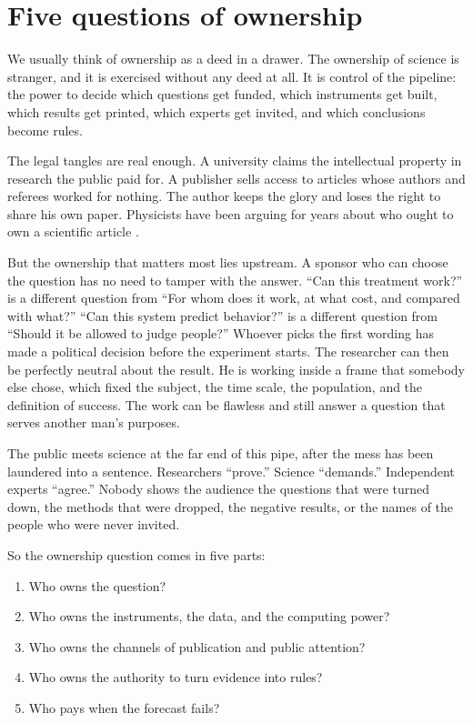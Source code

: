 \documentclass[12pt,a4paper]{book}
\begin{document}
\section{Five questions of ownership}

We usually think of ownership as a deed in a drawer. The ownership of science is stranger, and it is exercised without any deed at all. It is control of the pipeline: the power to decide which questions get funded, which instruments get built, which results get printed, which experts get invited, and which conclusions become rules.

The legal tangles are real enough. A university claims the intellectual property in research the public paid for. A publisher sells access to articles whose authors and referees worked for nothing. The author keeps the glory and loses the right to share his own paper. Physicists have been arguing for years about who ought to own a scientific article \cite{blume-aps-copyright}.

But the ownership that matters most lies upstream. A sponsor who can choose the question has no need to tamper with the answer. ``Can this treatment work?'' is a different question from ``For whom does it work, at what cost, and compared with what?'' ``Can this system predict behavior?'' is a different question from ``Should it be allowed to judge people?'' Whoever picks the first wording has made a political decision before the experiment starts. The researcher can then be perfectly neutral about the result. He is working inside a frame that somebody else chose, which fixed the subject, the time scale, the population, and the definition of success. The work can be flawless and still answer a question that serves another man's purposes.

The public meets science at the far end of this pipe, after the mess has been laundered into a sentence. Researchers ``prove.'' Science ``demands.'' Independent experts ``agree.'' Nobody shows the audience the questions that were turned down, the methods that were dropped, the negative results, or the names of the people who were never invited.

So the ownership question comes in five parts:

\begin{enumerate}
\item Who owns the question?
\item Who owns the instruments, the data, and the computing power?
\item Who owns the channels of publication and public attention?
\item Who owns the authority to turn evidence into rules?
\item Who pays when the forecast fails?
\end{enumerate}
\end{document}
